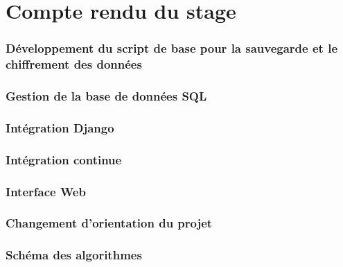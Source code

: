 \part{Compte rendu du stage}

\section{Développement du script de base pour la sauvegarde et le chiffrement des données}



\section{Gestion de la base de données SQL}



\section{Intégration Django}



\section{Intégration continue}



\section{Interface Web}



\section{Changement d'orientation du projet}



\section{Schéma des algorithmes}


